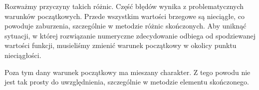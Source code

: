 \documentclass{article}
\begin{document}
Rozważmy przyczyny takich różnic. Część błędów wynika z problematycznych warunków początkowych. Przede wszystkim wartości brzegowe są nieciągłe, co powoduje zaburzenia, szczególnie w metodzie różnic skończonych. Aby uniknąć sytuacji, w której rozwiązanie numeryczne zdecydowanie odbiega od spodziewanej wartości funkcji, musieliśmy zmienić warunek początkowy w okolicy punktu nieciągłości.

Poza tym dany warunek początkowy ma mieszany charakter. Z tego powodu nie jest tak prosty do uwzględnienia, szczególnie w metodzie elementu skończonego.
\end{document}
